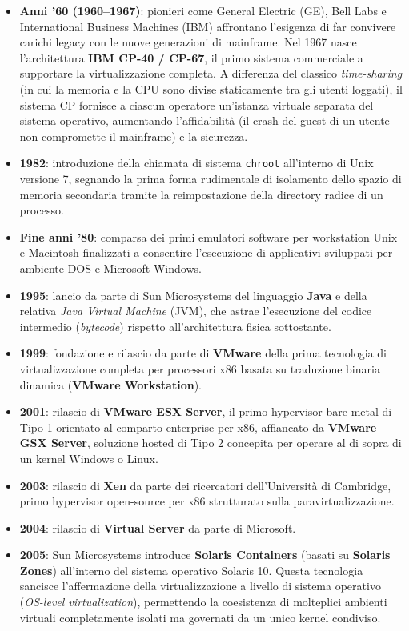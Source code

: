 \documentclass[11pt, a4paper]{article}
\begin{document}
\begin{itemize}
    \item \textbf{Anni '60 (1960--1967)}: pionieri come General Electric (GE), Bell Labs e International Business Machines (IBM) affrontano l'esigenza di far convivere carichi legacy con le nuove generazioni di mainframe. Nel 1967 nasce l'architettura \textbf{IBM CP-40 / CP-67}, il primo sistema commerciale a supportare la virtualizzazione completa. A differenza del classico \emph{time-sharing} (in cui la memoria e la CPU sono divise staticamente tra gli utenti loggati), il sistema CP fornisce a ciascun operatore un'istanza virtuale separata del sistema operativo, aumentando l'affidabilità (il crash del guest di un utente non compromette il mainframe) e la sicurezza.
    \item \textbf{1982}: introduzione della chiamata di sistema \texttt{chroot} all'interno di Unix versione 7, segnando la prima forma rudimentale di isolamento dello spazio di memoria secondaria tramite la reimpostazione della directory radice di un processo.
    \item \textbf{Fine anni '80}: comparsa dei primi emulatori software per workstation Unix e Macintosh finalizzati a consentire l'esecuzione di applicativi sviluppati per ambiente DOS e Microsoft Windows.
    \item \textbf{1995}: lancio da parte di Sun Microsystems del linguaggio \textbf{Java} e della relativa \emph{Java Virtual Machine} (JVM), che astrae l'esecuzione del codice intermedio (\emph{bytecode}) rispetto all'architettura fisica sottostante.
    \item \textbf{1999}: fondazione e rilascio da parte di \textbf{VMware} della prima tecnologia di virtualizzazione completa per processori x86 basata su traduzione binaria dinamica (\textbf{VMware Workstation}).
    \item \textbf{2001}: rilascio di \textbf{VMware ESX Server}, il primo hypervisor bare-metal di Tipo 1 orientato al comparto enterprise per x86, affiancato da \textbf{VMware GSX Server}, soluzione hosted di Tipo 2 concepita per operare al di sopra di un kernel Windows o Linux.
    \item \textbf{2003}: rilascio di \textbf{Xen} da parte dei ricercatori dell'Università di Cambridge, primo hypervisor open-source per x86 strutturato sulla paravirtualizzazione.
    \item \textbf{2004}: rilascio di \textbf{Virtual Server} da parte di Microsoft.
    \item \textbf{2005}: Sun Microsystems introduce \textbf{Solaris Containers} (basati su \textbf{Solaris Zones}) all'interno del sistema operativo Solaris 10. Questa tecnologia sancisce l'affermazione della virtualizzazione a livello di sistema operativo (\emph{OS-level virtualization}), permettendo la coesistenza di molteplici ambienti virtuali completamente isolati ma governati da un unico kernel condiviso.

\end{itemize}
\end{document}
